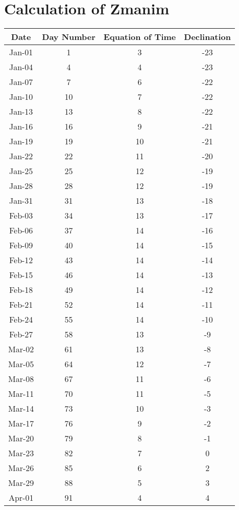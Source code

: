 \chapter{Calculation of Zmanim}

\begin{longtable}{c | c | c | c}
	Date&Day Number&Equation of Time&Declination\\\hline
	Jan-01 & 1 & 3 & -23\\\hline
	Jan-04 & 4 & 4 & -23\\\hline
	Jan-07 & 7 & 6 & -22\\\hline
	Jan-10 & 10 & 7 & -22\\\hline
	Jan-13 & 13 & 8 & -22\\\hline
	Jan-16 & 16 & 9 & -21\\\hline
	Jan-19 & 19 & 10 & -21\\\hline
	Jan-22 & 22 & 11 & -20\\\hline
	Jan-25 & 25 & 12 & -19\\\hline
	Jan-28 & 28 & 12 & -19\\\hline
	Jan-31 & 31 & 13 & -18\\\hline
	Feb-03 & 34 & 13 & -17\\\hline
	Feb-06 & 37 & 14 & -16\\\hline
	Feb-09 & 40 & 14 & -15\\\hline
	Feb-12 & 43 & 14 & -14\\\hline
	Feb-15 & 46 & 14 & -13\\\hline
	Feb-18 & 49 & 14 & -12\\\hline
	Feb-21 & 52 & 14 & -11\\\hline
	Feb-24 & 55 & 14 & -10\\\hline
	Feb-27 & 58 & 13 & -9\\\hline
	Mar-02 & 61 & 13 & -8\\\hline
	Mar-05 & 64 & 12 & -7\\\hline
	Mar-08 & 67 & 11 & -6\\\hline
	Mar-11 & 70 & 11 & -5\\\hline
	Mar-14 & 73 & 10 & -3\\\hline
	Mar-17 & 76 & 9 & -2\\\hline
	Mar-20 & 79 & 8 & -1\\\hline
	Mar-23 & 82 & 7 & 0\\\hline
	Mar-26 & 85 & 6 & 2\\\hline
	Mar-29 & 88 & 5 & 3\\\hline
	Apr-01 & 91 & 4 & 4\\\hline

\end{longtable}
